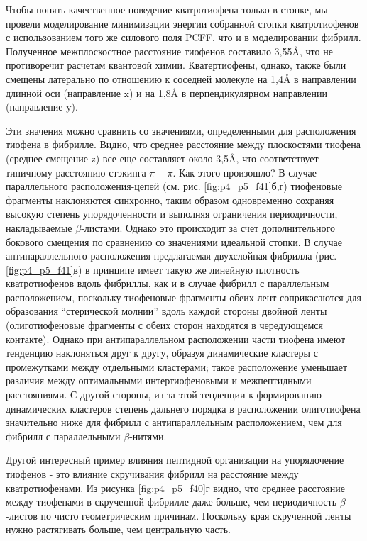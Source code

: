     Чтобы понять качественное поведение кватротиофена только в стопке, мы провели моделирование минимизации энергии собранной стопки кватротиофенов с использованием того же силового поля PCFF, что и в моделировании фибрилл. Полученное межплоскостное расстояние тиофенов составило 3,55\AA, что не противоречит расчетам квантовой химии. Кватертиофены, однако, также были смещены латерально по отношению к соседней молекуле на 1,4\AA{} в направлении длинной оси (направление x) и на 1,8\AA{} в перпендикулярном направлении (направление y).
    
    Эти значения можно сравнить со значениями, определенными для расположения тиофена в фибрилле. Видно, что среднее расстояние между плоскостями тиофена (среднее смещение z) все еще составляет около 3,5\AA, что соответствует типичному расстоянию стэкинга $\pi - \pi$. Как этого произошло? В случае параллельного расположения-цепей (см. рис. \ref{fig:p4_p5_f41}б,г) тиофеновые фрагменты наклоняются синхронно, таким образом одновременно сохраняя высокую степень упорядоченности и выполняя ограничения периодичности, накладываемые $\beta$-листами. Однако это происходит за счет дополнительного бокового смещения по сравнению со значениями идеальной стопки. В случае антипараллельного расположения предлагаемая двухслойная фибрилла (рис. \ref{fig:p4_p5_f41}в) в принципе имеет такую же линейную плотность кватротиофенов вдоль фибриллы, как и в случае фибрилл с параллельным расположением, поскольку тиофеновые фрагменты обеих лент соприкасаются для образования ``стерической молнии'' вдоль каждой стороны двойной ленты (олиготиофеновые фрагменты с обеих сторон находятся в чередующемся контакте). Однако при антипараллельном расположении части тиофена имеют тенденцию наклоняться друг к другу, образуя динамические кластеры с промежутками между отдельными кластерами; такое расположение уменьшает различия между оптимальными интертиофеновыми и межпептидными расстояниями. С другой стороны, из-за этой тенденции к формированию динамических кластеров степень дальнего порядка в расположении олиготиофена значительно ниже для фибрилл с антипараллельным расположением, чем для фибрилл с параллельными $\beta$-нитями.
    
    Другой интересный пример влияния пептидной организации на упорядочение тиофенов - это влияние скручивания фибрилл на расстояние между кватротиофенами. Из рисунка \ref{fig:p4_p5_f40}г видно, что среднее расстояние между тиофенами в скрученной фибрилле даже больше, чем периодичность $\beta$-листов по чисто геометрическим причинам. Поскольку края скрученной ленты нужно растягивать больше, чем центральную часть.
    
